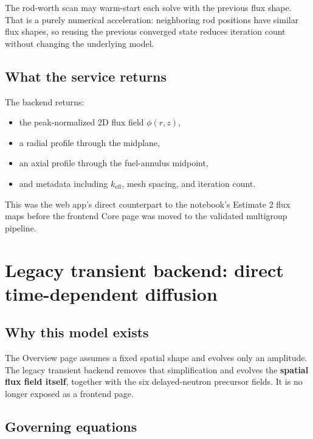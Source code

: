 \documentclass[11pt]{article}
\begin{document}
The rod-worth scan may warm-start each solve with the previous flux shape.  That
is a purely numerical acceleration: neighboring rod positions have similar flux
shapes, so reusing the previous converged state reduces iteration count without
changing the underlying model.

\subsection{What the service returns}

The backend returns:
\begin{itemize}
  \item the peak-normalized 2D flux field $\phi(r,z)$,
  \item a radial profile through the midplane,
  \item an axial profile through the fuel-annulus midpoint,
  \item and metadata including $k_{\mathrm{eff}}$, mesh spacing, and iteration count.
\end{itemize}

This was the web app's direct counterpart to the notebook's Estimate 2 flux
maps before the frontend Core page was moved to the validated multigroup
pipeline.

\section{Legacy transient backend: direct time-dependent diffusion}

\subsection{Why this model exists}

The Overview page assumes a fixed spatial shape and evolves only an amplitude.
The legacy transient backend removes that simplification and evolves the
\textbf{spatial flux field itself}, together with the six delayed-neutron
precursor fields.  It is no longer exposed as a frontend page.

\subsection{Governing equations}
\end{document}
